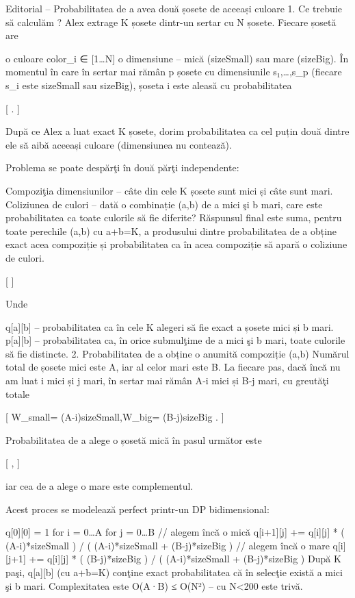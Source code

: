 Editorial – Probabilitatea de a avea două șosete de aceeași culoare
1. Ce trebuie să calculăm ?
Alex extrage K șosete dintr-un sertar cu N șosete.
Fiecare șosetă are

o culoare color_i ∈ [1…N]
o dimensiune – mică (sizeSmall) sau mare (sizeBig).
În momentul în care în sertar mai rămân p șosete cu dimensiunile s₁,…,s_p (fiecare s_i este sizeSmall sau sizeBig), șoseta i este aleasă cu probabilitatea

[ . ]

După ce Alex a luat exact K șosete, dorim probabilitatea ca cel puțin două dintre ele să aibă aceeași culoare (dimensiunea nu contează).

Problema se poate despărţi în două părţi independente:

Compoziţia dimensiunilor – câte din cele K șosete sunt mici și câte sunt mari.
Coliziunea de culori – dată o combinație (a,b) de a mici şi b mari, care este probabilitatea ca toate culorile să fie diferite?
Răspunsul final este suma, pentru toate perechile (a,b) cu a+b=K, a produsului dintre probabilitatea de a obține exact acea compoziție și probabilitatea ca în acea compoziție să apară o coliziune de culori.

[  ]

Unde

q[a][b] – probabilitatea ca în cele K alegeri să fie exact a șosete mici și b mari.
p[a][b] – probabilitatea ca, în orice submulţime de a mici şi b mari, toate culorile să fie distincte.
2. Probabilitatea de a obține o anumită compoziție (a,b)
Numărul total de șosete mici este A, iar al celor mari este B.
La fiecare pas, dacă încă nu am luat i mici și j mari, în sertar mai rămân A‑i mici și B‑j mari, cu greutăţi totale

[ W_{small}= (A-i)\cdot sizeSmall,\qquad W_{big}= (B-j)\cdot sizeBig . ]

Probabilitatea de a alege o șosetă mică în pasul următor este

[ , ]

iar cea de a alege o mare este complementul.

Acest proces se modelează perfect printr-un DP bidimensional:

q[0][0] = 1
for i = 0…A
  for j = 0…B
        // alegem încă o mică
        q[i+1][j] += q[i][j] * ( (A-i)*sizeSmall ) /
                               ( (A-i)*sizeSmall + (B-j)*sizeBig )
        // alegem încă o mare
        q[i][j+1] += q[i][j] * ( (B-j)*sizeBig )  /
                               ( (A-i)*sizeSmall + (B-j)*sizeBig )
După K paşi, q[a][b] (cu a+b=K) conţine exact probabilitatea că în selecţie există a mici şi b mari.
Complexitatea este O(A·B) ≤ O(N²) – cu N<200 este trivă.

